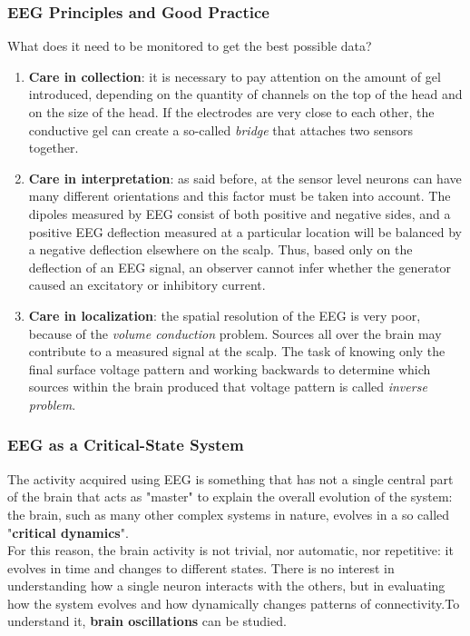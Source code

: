 \subsubsection{EEG Principles and Good Practice}
What does it need to be monitored to get the best possible data?
\begin{enumerate}
    \item \textbf{Care in collection}: it is necessary to pay attention on the amount of gel introduced, depending on the quantity 
    of channels on the top of the head and on the size of the head. If the electrodes are very close to each other, 
    the conductive gel can create a so-called \textit{bridge} that attaches two sensors together.
    \item \textbf{Care in interpretation}: as said before, at the sensor level neurons can have many different orientations and this factor 
    must be taken into account. The dipoles measured by EEG consist of both positive and negative sides, and a positive EEG 
    deflection measured at a particular location will be balanced by a negative deflection elsewhere on the scalp. Thus, based only on the 
    deflection of an EEG signal, an observer cannot infer whether the generator caused an excitatory or inhibitory current.
    \item \textbf{Care in localization}: the spatial resolution of the EEG is very poor, because of the \textit{volume conduction} problem. Sources all over the brain may contribute to a measured signal at the scalp. The task of knowing only the final surface voltage pattern and working 
    backwards to determine which sources within the brain produced that voltage pattern is called \textit{inverse problem}.
\end{enumerate}

\subsubsection{EEG as a Critical-State System}
The activity acquired using EEG is something that has not a single central part of the brain that acts as "master" to explain the 
overall evolution of the system: the brain, such as many other complex systems in nature, evolves in a so called "\textbf{critical dynamics}".\\
For this reason, the brain activity is not trivial, nor automatic, nor repetitive: it evolves in time and changes to different states.
There is no interest in understanding how a single neuron interacts with the others, but in evaluating how the system evolves and how dynamically 
changes patterns of connectivity.To understand it, \textbf{brain oscillations} can be studied.

